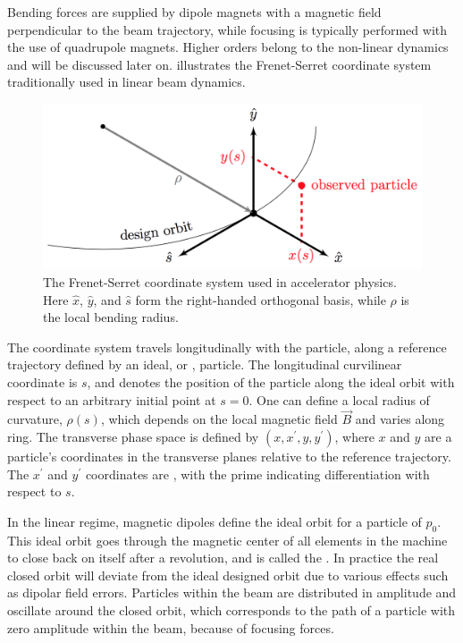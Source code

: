 Bending forces are supplied by dipole magnets with a magnetic field perpendicular to the beam trajectory, while focusing is typically performed with the use of quadrupole magnets.
Higher orders belong to the non-linear dynamics and will be discussed later on.
 illustrates the Frenet-Serret coordinate system traditionally used in linear beam dynamics.

\begin{figure}[!htb]
    \begin{center}
    \includegraphics[width = 0.8\linewidth]{Figures/Beam_Dynamics_Theory/Frenet_Serret_Coordinate_System.png}
    \caption{The Frenet-Serret coordinate system used in accelerator physics. Here \(\hat{x}\), \(\hat{y}\), and \(\hat{s}\) form the right-handed orthogonal basis, while \(\rho\) is the local bending radius.}
    \label{figure:frenet_serret_system}
    \end{center}
\end{figure}

The coordinate system travels longitudinally with the particle, along a reference trajectory defined by an ideal, or , particle.
The longitudinal curvilinear coordinate is \(s\), and denotes the position of the particle along the ideal orbit with respect to an arbitrary initial point at \(s = 0\).
One can define a local radius of curvature, \(\rho(s)\), which depends on the local magnetic field \(\vec{B}\) and varies along ring.
The transverse phase space is defined by \((x, x^{\prime}, y, y^{\prime})\), where \(x\) and \(y\) are a particle's coordinates in the transverse planes relative to the reference trajectory.
The \(x^{\prime}\) and \(y^{\prime}\) coordinates are , with the prime indicating differentiation with respect to \(s\).
\break

In the linear regime, magnetic dipoles define the ideal orbit for a particle of  \(p_0\).
This ideal orbit goes through the magnetic center of all elements in the machine to close back on itself after a revolution, and is called the .
In practice the real closed orbit will deviate from the ideal designed orbit due to various effects such as dipolar field errors.
Particles within the beam are distributed in amplitude and oscillate around the closed orbit, which corresponds to the path of a particle with zero amplitude within the beam, because of focusing forces. 
\break

